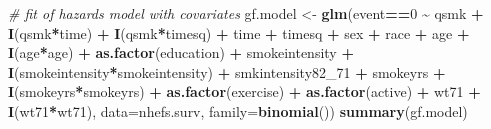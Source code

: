 \documentclass[
  10pt,
]{book}
\newenvironment{Shaded}{\begin{snugshade}}{\end{snugshade}}
\newcommand{\CommentTok}[1]{\textcolor[rgb]{0.56,0.35,0.01}{\textit{#1}}}
\newcommand{\DataTypeTok}[1]{\textcolor[rgb]{0.13,0.29,0.53}{#1}}
\newcommand{\DecValTok}[1]{\textcolor[rgb]{0.00,0.00,0.81}{#1}}
\newcommand{\KeywordTok}[1]{\textcolor[rgb]{0.13,0.29,0.53}{\textbf{#1}}}
\newcommand{\NormalTok}[1]{#1}
\newcommand{\OperatorTok}[1]{\textcolor[rgb]{0.81,0.36,0.00}{\textbf{#1}}}
\newcommand{\StringTok}[1]{\textcolor[rgb]{0.31,0.60,0.02}{#1}}
\begin{document}
\begin{Shaded}
\begin{Highlighting}[]
\CommentTok{\# fit of hazards model with covariates}
\NormalTok{gf.model \textless{}{-}}\StringTok{ }\KeywordTok{glm}\NormalTok{(event}\OperatorTok{==}\DecValTok{0} \OperatorTok{\textasciitilde{}}\StringTok{ }\NormalTok{qsmk }\OperatorTok{+}\StringTok{ }\KeywordTok{I}\NormalTok{(qsmk}\OperatorTok{*}\NormalTok{time) }\OperatorTok{+}\StringTok{ }\KeywordTok{I}\NormalTok{(qsmk}\OperatorTok{*}\NormalTok{timesq)}
                \OperatorTok{+}\StringTok{ }\NormalTok{time }\OperatorTok{+}\StringTok{ }\NormalTok{timesq }\OperatorTok{+}\StringTok{ }\NormalTok{sex }\OperatorTok{+}\StringTok{ }\NormalTok{race }\OperatorTok{+}\StringTok{ }\NormalTok{age }\OperatorTok{+}\StringTok{ }\KeywordTok{I}\NormalTok{(age}\OperatorTok{*}\NormalTok{age)}
                \OperatorTok{+}\StringTok{ }\KeywordTok{as.factor}\NormalTok{(education) }\OperatorTok{+}\StringTok{ }\NormalTok{smokeintensity }
                \OperatorTok{+}\StringTok{ }\KeywordTok{I}\NormalTok{(smokeintensity}\OperatorTok{*}\NormalTok{smokeintensity) }\OperatorTok{+}\StringTok{ }\NormalTok{smkintensity82\_}\DecValTok{71} 
                \OperatorTok{+}\StringTok{ }\NormalTok{smokeyrs }\OperatorTok{+}\StringTok{ }\KeywordTok{I}\NormalTok{(smokeyrs}\OperatorTok{*}\NormalTok{smokeyrs) }\OperatorTok{+}\StringTok{ }\KeywordTok{as.factor}\NormalTok{(exercise) }
                \OperatorTok{+}\StringTok{ }\KeywordTok{as.factor}\NormalTok{(active) }\OperatorTok{+}\StringTok{ }\NormalTok{wt71 }\OperatorTok{+}\StringTok{ }\KeywordTok{I}\NormalTok{(wt71}\OperatorTok{*}\NormalTok{wt71), }
                \DataTypeTok{data=}\NormalTok{nhefs.surv, }\DataTypeTok{family=}\KeywordTok{binomial}\NormalTok{())}
\KeywordTok{summary}\NormalTok{(gf.model)}
\end{Highlighting}
\end{Shaded}
\end{document}
